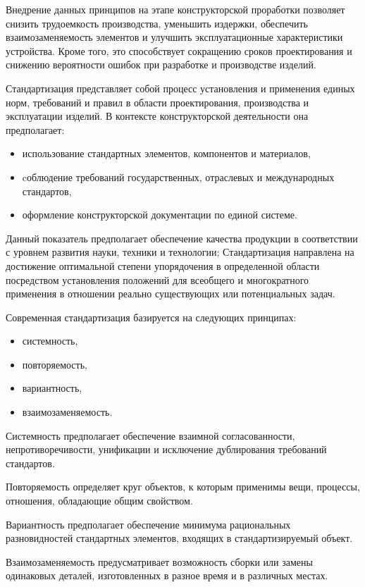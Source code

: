 Внедрение данных принципов на этапе конструкторской проработки
позволяет снизить трудоемкость производства, уменьшить издержки,
обеспечить взаимозаменяемость элементов и улучшить эксплуатационные
характеристики устройства. Кроме того, это способствует сокращению
сроков проектирования и снижению вероятности ошибок при разработке и
производстве изделий.

Стандартизация представляет собой процесс установления и применения
единых норм, требований и правил в области проектирования,
производства и эксплуатации изделий. В контексте конструкторской
деятельности она предполагает:

\begin{itemize}
\item использование стандартных элементов, компонентов и материалов,
\item cоблюдение требований государственных,
  отраслевых и международных стандартов,
\item  оформление конструкторской документации по единой системе.
\end{itemize}

Данный показатель предполагает обеспечение качества продукции в
соответствии с уровнем развития науки, техники и технологии;
Стандартизация направлена на достижение оптимальной степени
упорядочения в определенной области посредством установления положений
для всеобщего и многократного применения в отношении реально
существующих или потенциальных задач.

Современная стандартизация базируется на следующих принципах:
\begin{itemize}
\item системность,  
\item повторяемость, 
\item вариантность,
\item  взаимозаменяемость.
\end{itemize}

Системность предполагает обеспечение взаимной согласованности,
непротиворечивости, унификации и исключение дублирования требований
стандартов.

Повторяемость определяет круг объектов, к которым применимы вещи,
процессы, отношения, обладающие общим свойством.

Вариантность предполагает обеспечение минимума рациональных
разновидностей стандартных элементов, входящих в стандартизируемый
объект.

Взаимозаменяемость предусматривает возможность сборки или замены
одинаковых деталей, изготовленных в разное время и в различных местах.

